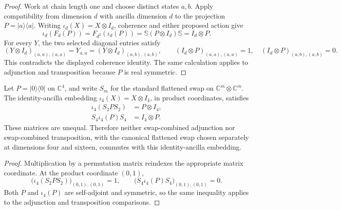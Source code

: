 \begin{proof}\leanok
    Work at chain length one and choose distinct states $a,b$. Apply
    compatibility from dimension $d$ with ancilla dimension $d$ to the
    projection $P=\lvert a\rangle\langle a\rvert$. Writing
    $\iota_d(X)=X\otimes I_d$, coherence and either proposed action give
    \[
        \iota_d(F_d(P))=F_{d^2}(\iota_d(P))
        =\mathbb S(P\otimes I_d)\mathbb S=I_d\otimes P.
    \]
    For every $Y$, the two selected diagonal entries satisfy
    \[
        (Y\otimes I_d)_{(a,a),(a,a)}=Y_{a,a}
        =(Y\otimes I_d)_{(a,b),(a,b)},
        \qquad
        (I_d\otimes P)_{(a,a),(a,a)}=1,
        \quad
        (I_d\otimes P)_{(a,b),(a,b)}=0.
    \]
    This contradicts the displayed coherence identity. The same
    calculation applies to adjunction and transposition because $P$
    is real symmetric.
\end{proof}

\begin{lemma}
    \label{lem:mpu_flattened_swap_ancilla_obstruction}
    \leanok
    Let $P=\lvert0\rangle\langle0\rvert$ on $\mathbb C^4$, and write
    $S_m$ for the standard flattened swap on
    $\mathbb C^m\otimes\mathbb C^m$. The identity-ancilla embedding
    $\iota_4(X)=X\otimes I_4$, in product coordinates, satisfies
    \begin{align}
        \iota_4(S_2PS_2) & =P\otimes I_4, \\
        S_4\iota_4(P)S_4 & =I_4\otimes P.
    \end{align}
    These matrices are unequal. Therefore neither swap-combined
    adjunction nor swap-combined transposition, with the canonical
    flattened swap chosen separately at dimensions four and sixteen,
    commutes with this identity-ancilla embedding.
\end{lemma}

\begin{proof}\leanok
    Multiplication by a permutation matrix reindexes the appropriate
    matrix coordinate. At the product coordinate $(0,1)$,
    \[
        \bigl(\iota_4(S_2PS_2)\bigr)_{(0,1),(0,1)}=1,
        \qquad
        \bigl(S_4\iota_4(P)S_4\bigr)_{(0,1),(0,1)}=0.
    \]
    Both $P$ and
    $\iota_4(P)$ are self-adjoint and symmetric, so the same inequality
    applies to the adjunction and transposition comparisons.
\end{proof}

